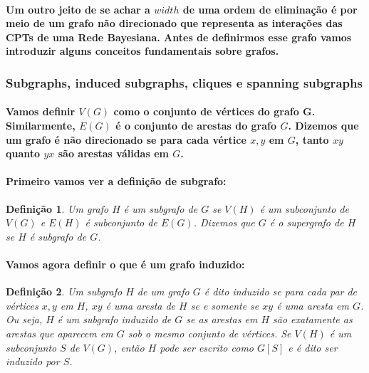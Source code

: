 \documentclass[a4paper,10pt]{article}
\theoremstyle{plain}
\newtheorem*{spn-def}{Definição}
\begin{document}
\paragraph{
  Um outro jeito de se achar a $width$ de uma ordem de eliminação é por meio de um grafo não 
  direcionado que representa as interações das CPTs de uma Rede Bayesiana. Antes de definirmos
  esse grafo vamos introduzir alguns conceitos fundamentais sobre grafos.
}

\subsubsection{Subgraphs, induced subgraphs, cliques e spanning subgraphs}

\paragraph{
  Vamos definir $V(G)$ como o conjunto de vértices do grafo G. Similarmente, $E(G)$ é o conjunto de
  arestas do grafo $G$. Dizemos que um grafo é não direcionado se para cada vértice $x, y$ em $G$,
  tanto $xy$ quanto $yx$ são arestas válidas em $G$.
}

\paragraph{
  Primeiro vamos ver a definição de subgrafo:
}

\begin{spn-def} Um grafo $H$ é um subgrafo de $G$ se $V(H)$ é um subconjunto de $V(G)$ e $E(H)$ é
  subconjunto de $E(G)$. Dizemos que $G$ é o supergrafo de $H$ se $H$ é subgrafo de $G$.
\end{spn-def}

\paragraph{
  Vamos agora definir o que é um grafo induzido:
}

\begin{spn-def} Um subgrafo $H$ de um grafo $G$ é dito induzido se para cada par de vértices $x, y$
  em $H$, $xy$ é uma aresta de $H$ se e somente se $xy$ é uma aresta em $G$. Ou seja, $H$ é 
  um subgrafo induzido de $G$ se as arestas em $H$ são exatamente as arestas que aparecem em $G$ 
  sob o mesmo conjunto de vértices. Se $V(H)$ é um subconjunto $S$ de $V(G)$, então $H$ pode ser
  escrito como $G[S]$ e é dito ser induzido por $S$.
\end{spn-def}
\end{document}
